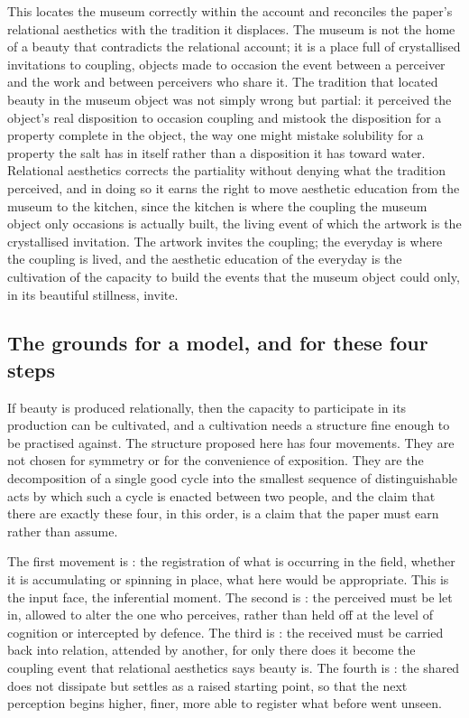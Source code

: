This locates the museum correctly within the account and reconciles the paper's relational aesthetics with the tradition it displaces. The museum is not the home of a beauty that contradicts the relational account; it is a place full of crystallised invitations to coupling, objects made to occasion the event between a perceiver and the work and between perceivers who share it. The tradition that located beauty in the museum object was not simply wrong but partial: it perceived the object's real disposition to occasion coupling and mistook the disposition for a property complete in the object, the way one might mistake solubility for a property the salt has in itself rather than a disposition it has toward water. Relational aesthetics corrects the partiality without denying what the tradition perceived, and in doing so it earns the right to move aesthetic education from the museum to the kitchen, since the kitchen is where the coupling the museum object only occasions is actually built, the living event of which the artwork is the crystallised invitation. The artwork invites the coupling; the everyday is where the coupling is lived, and the aesthetic education of the everyday is the cultivation of the capacity to build the events that the museum object could only, in its beautiful stillness, invite.

\subsection{The grounds for a model, and for these four steps}
\label{p22:sub:why-four}

If beauty is produced relationally, then the capacity to participate in its production can be cultivated, and a cultivation needs a structure fine enough to be practised against. The structure proposed here has four movements. They are not chosen for symmetry or for the convenience of exposition. They are the decomposition of a single good cycle into the smallest sequence of distinguishable acts by which such a cycle is enacted between two people, and the claim that there are exactly these four, in this order, is a claim that the paper must earn rather than assume.

The first movement is : the registration of what is occurring in the field, whether it is accumulating or spinning in place, what here would be appropriate. This is the input face, the inferential moment. The second is : the perceived must be let in, allowed to alter the one who perceives, rather than held off at the level of cognition or intercepted by defence. The third is : the received must be carried back into relation, attended by another, for only there does it become the coupling event that relational aesthetics says beauty is. The fourth is : the shared does not dissipate but settles as a raised starting point, so that the next perception begins higher, finer, more able to register what before went unseen.

